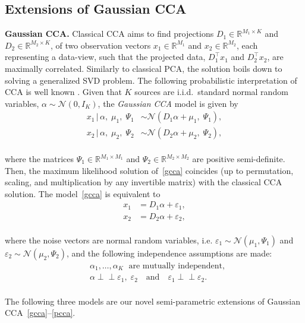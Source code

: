 \documentclass{article}
\newcommand{\ppp}{\textbf}
\newcommand{\R}{\mathbb{R}}
\newcommand{\ncal}{\mathcal{N}}
\newcommand{\ci}{\perp\!\!\!\perp}
\begin{document}
\subsection{Extensions of Gaussian CCA}
\label{sec:models}
\ppp{Gaussian CCA.}
Classical CCA \citep{Hot1936} aims to find projections $D_1\in\R^{M_1\times K}$ and $D_2\in\R^{M_2\times K}$, of two observation vectors $x_1\in\R^{M_1}$ and $x_2\in\R^{M_2}$, each representing a data-view, such that the projected data, $D_1^{\top}x_1$ and $D_2^{\top}x_2$, are maximally correlated. Similarly to classical PCA, the solution boils down to solving a generalized SVD problem. 
The following probabilistic interpretation of CCA is well known \citep{Bro1979,BacJor2005,KlaEtAl2013}. 
Given that $K$ sources are i.i.d.~standard normal random variables, $\alpha\sim\ncal(0,I_K)$, the \emph{Gaussian CCA} model is given by
\\[-0.6em]
\begin{equation}\label{gcca}
\begin{aligned}
x_1\, |\, \alpha,\;\mu_1,\;\Psi_1 &\sim \ncal(D_1 \alpha + \mu_1, \; \Psi_1), \\ 
x_2 \, |\, \alpha,\;\mu_2,\;\Psi_2 &\sim \ncal(D_2 \alpha + \mu_2, \; \Psi_2), 
\end{aligned}
\end{equation}
\\[-0.4em]
where the matrices $\Psi_1\in\R^{M_1\times M_1}$ and $\Psi_2\in\R^{M_2\times M_2}$ are positive semi-definite.
Then, the maximum likelihood solution of~\eqref{gcca} coincides (up to permutation, scaling, and multiplication by any invertible matrix) with the classical CCA solution. 
The model~\eqref{gcca} is equivalent to
\\[-0.6em]
\begin{equation}\label{pcca}
\begin{aligned}
x_1 &= D_1 \alpha + \varepsilon_1,\\ 
x_2 &= D_2 \alpha + \varepsilon_2,
\end{aligned}
\end{equation}
\\[-0.6em]
where the noise vectors are normal random variables, i.e. $\varepsilon_1\sim \ncal(\mu_1,\Psi_1)$ and $\varepsilon_2 \sim \ncal(\mu_2,\Psi_2)$,
and the following independence assumptions are made:
\\[-0.7em]
\begin{equation}\label{indep}
\begin{aligned}
&\alpha_1,\dots,\alpha_K \; \mbox{ are mutually independent}, \\
&\alpha \ci \varepsilon_1,\;\varepsilon_2 \quad \mbox{and} \quad \varepsilon_1 \ci \varepsilon_2.
\end{aligned}
\end{equation}
\\[-0.7em]
The following three models are our novel semi-parametric extensions of Gaussian CCA~\eqref{gcca}--\eqref{pcca}.
\end{document}
